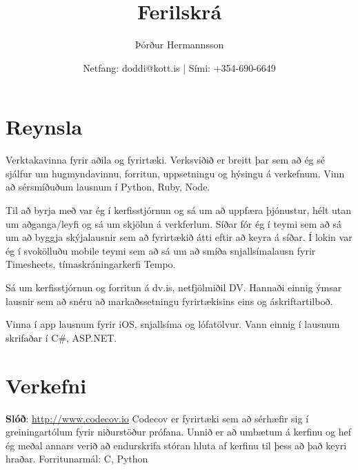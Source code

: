 \documentclass{cv_styles}
\title{Ferilskrá}
\author{Þórður Hermannsson}
\date{Netfang: doddi@kott.is | Sími: +354-690-6649}
\begin{document}
\setcounter{secnumdepth}{0} %
\maketitle
\section{Reynsla}
Verktakavinna fyrir aðila og fyrirtæki. Verksviðið er breitt þar sem að 
ég sé sjálfur um hugmyndavinnu, forritun, uppsetningu og hýsingu á verkefnum.
Vinn að sérsmíðuðum lausnum í Python, Ruby, Node.


Til að byrja með var ég í kerfisstjórnun og sá um að uppfæra þjónustur, hélt utan um aðganga/leyfi og sá um skjölun á verkferlum. Síðar fór ég í teymi sem að sá um að byggja skýjalausnir sem að fyrirtækið átti eftir að keyra á síðar. Í lokin var ég í svokölluðu mobile teymi sem að sá um að smíða snjallsímalausn fyrir Timesheets, tímaskráningarkerfi Tempo.

Sá um kerfisstjórnun og forritun á dv.is, netfjölmiðil DV. Hannaði einnig ýmsar lausnir sem að snéru að markaðssetningu fyrirtækisins eins og áskriftartilboð.

Vinna í app lausnum fyrir iOS, snjallsíma og lófatölvur. Vann einnig í lausnum skrifaðar í C\#, ASP.NET.

\section{Verkefni}
\textbf{Slóð}: \href{http://www.codecov.io}{http://www.codecov.io} \newline
Codecov er fyrirtæki sem að sérhæfir sig í greiningartólum fyrir niðurstöður prófana.
Unnið er að umbætum á kerfinu og hef ég meðal annars verið að endurskrifa stóran hluta af kerfinu til þess að það keyri hraðar.
Forritunarmál: C, Python
\end{document}
